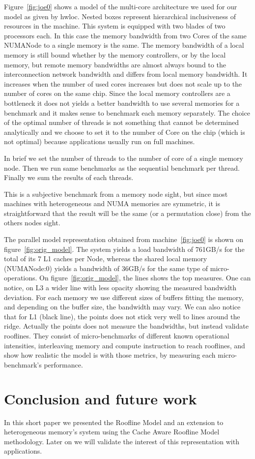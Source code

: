 \documentclass[twoside,twocolumn,8pt]{extarticle}
\begin{document}
Figure~\ref{fig:joe0} shows a model of the multi-core architecture we used for our model as given by hwloc.
Nested boxes represent hierarchical inclusiveness of resources in the machine.
This system is equipped with two blades of two processors each.
In this case the memory bandwidth from two Cores of the same NUMANode to a single memory is the same.
The memory bandwidth of a local memory is still bound whether by the memory controllers, or by the local memory, but remote memory
bandwidths are almost always bound to the interconnection network bandwidth and differs from local memory bandwidth.
It increases when the number of used cores increases but does not scale up to the number of cores on the same chip.
Since the local memory controllers are a bottleneck it does not yields a better bandwidth to use several memories for a
benchmark and it makes sense to benchmark each memory separately.
The choice of the optimal number of threads is not something that cannot be determined analytically and we choose to
set it to the number of Core on the chip (which is not optimal) because applications usually run on full machines.

In brief we set the number of threads to the number of core of a single memory node. Then we run same benchmarks as the sequential
benchmark per thread. Finally we sum the results of each threads.

This is a subjective benchmark from a memory node sight, but since most machines with heterogeneous and NUMA memories are
symmetric, it is straightforward that the result will be the same (or a permutation close) from the others nodes sight.

The parallel model representation obtained from machine~\ref{fig:joe0} is shown on figure~\ref{fig:orig_model}.
The system yields a load bandwidth of 761GB/s for the total of its 7 L1 caches per Node, whereas the shared local memory
(NUMANode:0) yields a bandwidth of 36GB/s for the same type of micro-operations.
On figure~\ref{fig:orig_model}, the lines shows the top measures.
One can notice, on L3 a wider line with less opacity showing the measured bandwidth deviation.
For each memory we use different sizes of buffers fitting the memory, and depending on the buffer size, the bandwidth may vary.
We can also notice that for L1 (black line), the points does not stick very well to lines around the ridge. Actually the points
does not measure the bandwidths, but instead validate rooflines. They consist of micro-benchmarks of different known operational
intensities, interleaving memory and compute instruction to reach rooflines, and show how realistic the model is with those
metrics, by measuring each micro-benchmark's performance.

\section{Conclusion and future work}\label{sec:conclusion}
In this short paper we presented the Roofline Model and an extension to heterogeneous memory's system using the Cache Aware
Roofline Model methodology. Later on we will validate the interest of this representation with applications. 



\end{document}
